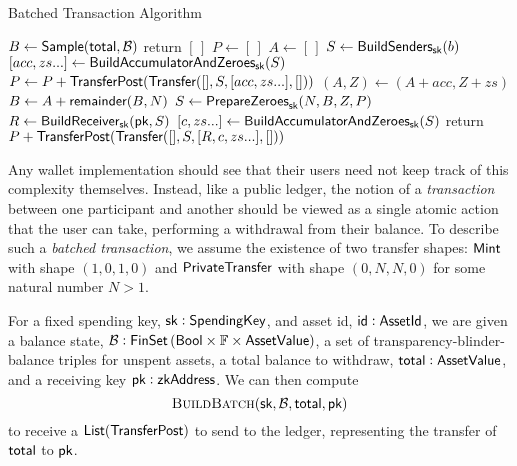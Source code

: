 \begin{algorithm*}
\caption{Batched Transaction Algorithm}
\begin{algorithmic}
        \State $B \gets {\textsf{Sample}}({\textsf{total}}, \mathcal{B})$  
            \State \textsf{return} $[\,]$ 
        \EndIf
        \State $P \gets [\,]$ 
         
            \State $A \gets [\,]$
             
                \State $S \gets {\textsf{BuildSenders}}_{\textsf{sk}}(b)$
                \State $[acc, zs...] \gets {\textsf{BuildAccumulatorAndZeroes}}_{\textsf{sk}}(S)$ 
                \State $P \gets P + {\textsf{TransferPost}}({\textsf{Transfer}}([], S, [acc, zs...], []))$
                \State $(A, Z) \gets (A + acc, Z + zs)$ 
            \EndFor
            \State $B \gets A + {\textsf{remainder}}(B, N)$
        \EndWhile
        \State $S \gets {\textsf{PrepareZeroes}}_{\textsf{sk}}(N, B, Z, P)$ 
        \State $R \gets {\textsf{BuildReceiver}}_{\textsf{sk}}({\textsf{pk}}, S)$
        \State $[c, zs...] \gets {\textsf{BuildAccumulatorAndZeroes}}_{\textsf{sk}}(S)$
        \State \textsf{return} $P + {\textsf{TransferPost}}({\textsf{Transfer}}([], S, [R, c, zs...], []))$
    \EndProcedure
\end{algorithmic}
\end{algorithm*}

Any wallet implementation should see that their users need not keep track of this complexity themselves. Instead, like a public ledger, the notion of a \emph{transaction} between one participant and another should be viewed as a single atomic action that the user can take, performing a withdrawal from their balance. To describe such a \emph{batched transaction}, we assume the existence of two transfer shapes\footnotemark{}: ${\textsf{Mint}}$ with shape $(1, 0, 1, 0)$ and ${\textsf{PrivateTransfer}}$ with shape $(0, N, N, 0)$ for some natural number $N > 1$.


For a fixed spending key, ${\textsf{sk}} : {\textsf{SpendingKey}}$, and asset id, ${\textsf{id}} : {\textsf{AssetId}}$, we are given a balance state, $\mathcal{B} : {\textsf{FinSet}}\left({\textsf{Bool}} \times {\mathbb{F}} \times {\textsf{AssetValue}}\right)$, a set of transparency-blinder-balance triples for unspent assets, a total balance to withdraw, ${\textsf{total}} : {\textsf{AssetValue}}$, and a receiving key ${\textsf{pk}} : {\textsf{zkAddress}}$. We can then compute 
\[\textsc{BuildBatch}({\textsf{sk}}, \mathcal{B}, {\textsf{total}}, {\textsf{pk}})\]
to receive a ${\textsf{List}}({\textsf{TransferPost}})$ to send to the ledger, representing the transfer of ${\textsf{total}}$ to ${\textsf{pk}}$.

